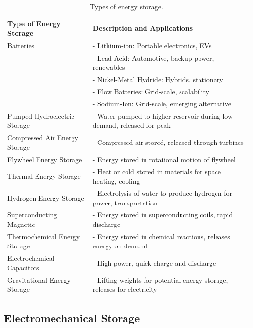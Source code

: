 \begin{center}
\begin{table}[!ht]
	\begin{center}
		\caption{Types of energy storage.}
		\begin{tabular}{|p{6cm}|p{8cm}|} %
			\hline
			\textbf{Type of Energy Storage} & \textbf{Description and Applications}\\
			\hline
			Batteries & - Lithium-ion: Portable electronics, EVs\\
					  & - Lead-Acid: Automotive, backup power, renewables\\
					  & - Nickel-Metal Hydride: Hybrids, stationary\\
					  & - Flow Batteries: Grid-scale, scalability\\
					  & - Sodium-Ion: Grid-scale, emerging alternative\\
			\hline
			Pumped Hydroelectric Storage & - Water pumped to higher reservoir during low demand, released for peak\\
			\hline
			Compressed Air Energy Storage & - Compressed air stored, released through turbines\\
			\hline
			Flywheel Energy Storage & - Energy stored in rotational motion of flywheel\\
			\hline
			Thermal Energy Storage & - Heat or cold stored in materials for space heating, cooling\\
			\hline
			Hydrogen Energy Storage & - Electrolysis of water to produce hydrogen for power, transportation\\
			\hline
			Superconducting Magnetic & - Energy stored in superconducting coils, rapid discharge\\
			\hline
			Thermochemical Energy Storage & - Energy stored in chemical reactions, releases energy on demand\\
			\hline
			Electrochemical Capacitors & - High-power, quick charge and discharge\\
			\hline
			Gravitational Energy Storage & - Lifting weights for potential energy storage, releases for electricity\\
			\hline
		\end{tabular}
	\end{center}
\subsection{Electromechanical Storage} 
\end{table}
\end{center}

